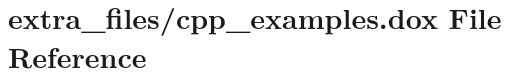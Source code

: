 \hypertarget{cpp__examples_8dox}{}\section{extra\+\_\+files/cpp\+\_\+examples.dox File Reference}
\label{cpp__examples_8dox}
